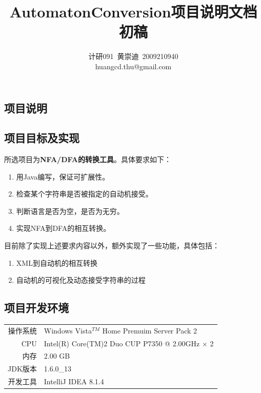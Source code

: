 \documentclass[12pt,a4paper]{article}
\author{计研091~黄崇迪~2009210940\\huangcd.thu@gmail.com}
\title{AutomatonConversion项目说明文档\\初稿}
\begin{document}
\begin{CJK}{UTF8}{hei}
    \maketitle
\end{CJK}
\begin{CJK}{UTF8}{song}
    \tableofcontents
    \newpage

    \section{项目说明}
    \subsection{项目目标及实现}
    所选项目为\textbf{NFA/DFA的转换工具}。具体要求如下：
    \begin{small}
    \begin{enumerate}
    \item 用Java编写，保证可扩展性。
    \item 检查某个字符串是否被指定的自动机接受。
    \item 判断语言是否为空，是否为无穷。
    \item 实现NFA到DFA的相互转换。
    \end{enumerate}
    \end{small}

    目前除了实现上述要求内容以外，额外实现了一些功能，具体包括：
    \begin{small}
    \begin{enumerate}
    \item XML到自动机的相互转换
    \item 自动机的可视化及动态接受字符串的过程
    \end{enumerate}
    \end{small}

    \subsection{项目开发环境}

    \begin{tabular}{r|l}
    \hline
    操作系统 & Windows Vista$^{TM}$ Home Premuim Server Pack 2\\
    CPU & Intel(R) Core(TM)2 Duo CUP P7350 @ 2.00GHz $\times$ 2\\
    内存 & 2.00 GB\\
    JDK版本 & 1.6.0\_13\\
    开发工具 & IntelliJ IDEA 8.1.4\\
    \hline
    \end{tabular}


\end{CJK}
\end{document}

